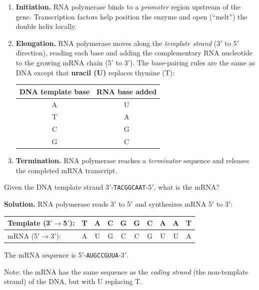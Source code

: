 \begin{enumerate}[leftmargin=1.8em]
  \item \textbf{Initiation.} RNA polymerase binds to a \emph{promoter} region upstream of the gene. Transcription factors help position the enzyme and open (``melt'') the double helix locally.

  \item \textbf{Elongation.} RNA polymerase moves along the \emph{template strand} (3$'$ to 5$'$ direction), reading each base and adding the complementary RNA nucleotide to the growing mRNA chain (5$'$ to 3$'$). The base-pairing rules are the same as DNA except that \textbf{uracil (U)} replaces thymine (T):
  \begin{center}
  \begin{tabular}{cc}
  \toprule
  \textbf{DNA template base} & \textbf{RNA base added} \\
  \midrule
  A & U \\
  T & A \\
  C & G \\
  G & C \\
  \bottomrule
  \end{tabular}
  \end{center}

  \item \textbf{Termination.} RNA polymerase reaches a \emph{terminator} sequence and releases the completed mRNA transcript.
\end{enumerate}

\begin{example}[Transcription]
Given the DNA template strand 3$'$-\texttt{TACGGCAAT}-5$'$, what is the mRNA?

\textbf{Solution.} RNA polymerase reads 3$'$ to 5$'$ and synthesizes mRNA 5$'$ to 3$'$:
\begin{center}
\begin{tabular}{lccccccccc}
Template (3$'$$\to$5$'$): & T & A & C & G & G & C & A & A & T \\
\midrule
mRNA (5$'$$\to$3$'$): & A & U & G & C & C & G & U & U & A \\
\end{tabular}
\end{center}
The mRNA sequence is 5$'$-\texttt{AUGCCGUUA}-3$'$.

Note: the mRNA has the same sequence as the \emph{coding strand} (the non-template strand) of the DNA, but with U replacing T.
\end{example}

